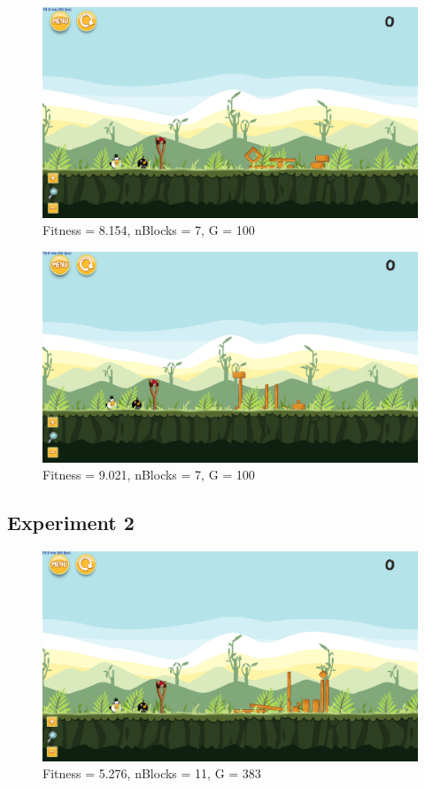 \begin{figure}[H]
	\centering
	\includegraphics[scale=0.35]{gfx/e1/level-0-180523_194214.png}
	\caption{Fitness = 8.154, nBlocks = 7, G = 100 }\label{f:e1-3}
\end{figure}

\begin{figure}[H]
	\centering
	\includegraphics[scale=0.35]{gfx/e1//level-0-180523_203106.png}
	\caption{Fitness = 9.021, nBlocks = 7, G = 100  }\label{f:e1-4}
\end{figure}

\subsection{Experiment 2}\label{a:e2}

\begin{figure}[H]
	\centering
	\includegraphics[scale=0.35]{gfx/e2/level-0-base_large180524_182751.png}
	\caption{Fitness = 5.276, nBlocks = 11, G = 383 }\label{f:e2-1}
\end{figure}

